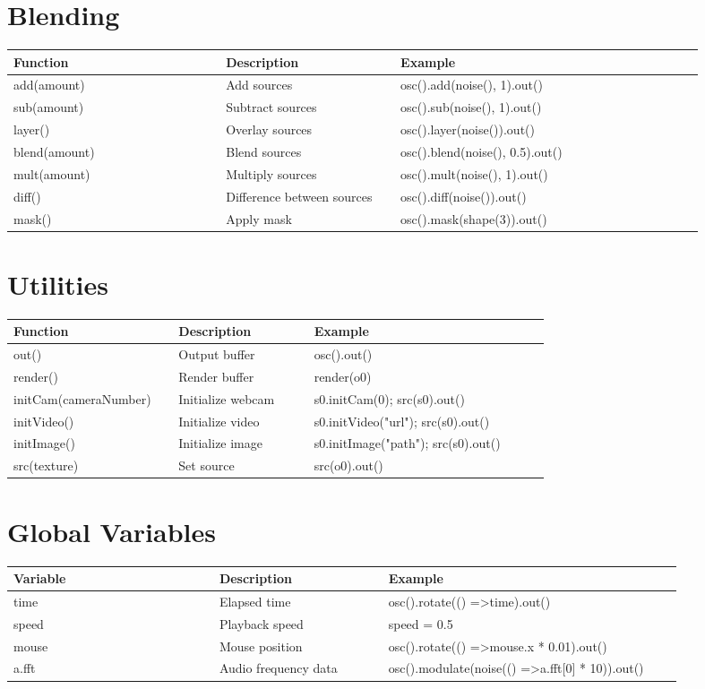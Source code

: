 \documentclass[9pt,oneside]{amsart}
\begin{document}
\section*{Blending}
\begin{tabular}{L{0.28\linewidth}L{0.23\linewidth}L{0.40\linewidth}}
\toprule
\textbf{Function} & \textbf{Description} & \textbf{Example} \\
\midrule
add(amount) & Add sources & osc().add(noise(), 1).out() \\
sub(amount) & Subtract sources & osc().sub(noise(), 1).out() \\
layer() & Overlay sources & osc().layer(noise()).out() \\
blend(amount) & Blend sources & osc().blend(noise(), 0.5).out() \\
mult(amount) & Multiply sources & osc().mult(noise(), 1).out() \\
diff() & Difference between sources & osc().diff(noise()).out() \\
mask() & Apply mask & osc().mask(shape(3)).out() \\
\bottomrule
\end{tabular}

\section*{Utilities}
\begin{tabular}{L{0.28\linewidth}L{0.23\linewidth}L{0.40\linewidth}}
\toprule
\textbf{Function} & \textbf{Description} & \textbf{Example} \\
\midrule
out() & Output buffer & osc().out() \\
render() & Render buffer & render(o0) \\
initCam(cameraNumber) & Initialize webcam & s0.initCam(0); src(s0).out() \\
initVideo() & Initialize video & s0.initVideo("url"); src(s0).out() \\
initImage() & Initialize image & s0.initImage("path"); src(s0).out() \\
src(texture) & Set source & src(o0).out() \\
\bottomrule
\end{tabular}

\section*{Global Variables}
\begin{tabular}{L{0.28\linewidth}L{0.23\linewidth}L{0.40\linewidth}}
\toprule
\textbf{Variable} & \textbf{Description} & \textbf{Example} \\
\midrule
time & Elapsed time & osc().rotate(() =\textgreater  time).out() \\
speed & Playback speed & speed = 0.5 \\
mouse & Mouse position & osc().rotate(() =\textgreater  mouse.x * 0.01).out() \\
a.fft & Audio frequency data & osc().modulate(noise(() =\textgreater  a.fft[0] * 10)).out() \\
\bottomrule
\end{tabular}
\end{document}
